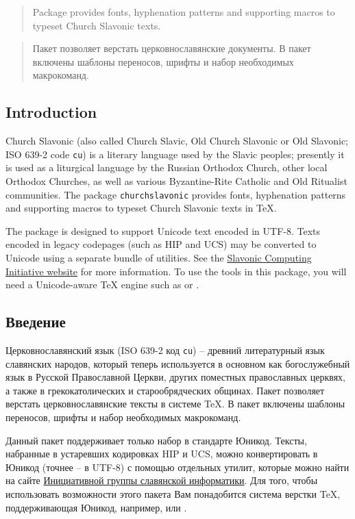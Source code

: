 \begin{EN}
\begin{abstract}
Package  provides fonts, hyphenation patterns and supporting macros to typeset
Church Slavonic texts.
\end{abstract}
\end{EN}

\begin{RU}
\begin{abstract}
Пакет  позволяет верстать церковнославянские документы. В пакет включены шаблоны переносов,
шрифты и набор необходимых макрокоманд.
\end{abstract}
\end{RU}

\tableofcontents

\begin{EN}
\section*{Introduction}
Church Slavonic (also called Church Slavic, Old Church Slavonic
or Old Slavonic; ISO 639-2 code \texttt{cu}) is a literary language used by
the Slavic peoples; presently it is used as a liturgical language by the
Russian Orthodox Church, other local Orthodox Churches, as well
as various Byzantine-Rite Catholic and Old Ritualist communities.
The package \texttt{churchslavonic} provides fonts, hyphenation
patterns and supporting macros to typeset
Church Slavonic texts in \TeX{}.

The package is designed to support Unicode text encoded in UTF-8.
Texts encoded in legacy codepages (such as HIP and UCS) may be
converted to Unicode using a separate bundle of utilities.
See the \href{http://sci.ponomar.net/}
{Slavonic Computing Initiative website} for more information.
To use the tools in this package, you will need a Unicode-aware \TeX{}
engine such as \XeTeX{} or \LuaTeX{}.
\end{EN}

\begin{RU}
\section*{Введение}
Церковнославянский язык (ISO 639-2 код \texttt{cu}) --
древний литературный язык славянских народов,
который теперь используется в основном как богослужебный язык
в Русской Православной Церкви, других поместных православных
церквях, а также в грекокатолических и старообрядческих общинах.
Пакет  позволяет верстать церковнославянские тексты
в системе \TeX{}. В пакет включены шаблоны переносов,
шрифты и набор необходимых макрокоманд.

Данный пакет поддерживает только набор в стандарте Юникод.
Тексты, набранные в устаревших кодировках HIP и UCS,
можно конвертировать в Юникод (точнее -- в UTF-8) с помощью
отдельных утилит, которые можно найти на сайте
\href{http://sci.ponomar.net/}
{Инициативной группы славянской информатики}.
Для того, чтобы использовать возможности этого пакета Вам
понадобится система верстки \TeX{}, поддерживающая Юникод,
например, \XeTeX{} или \LuaTeX{}.
\end{RU}

